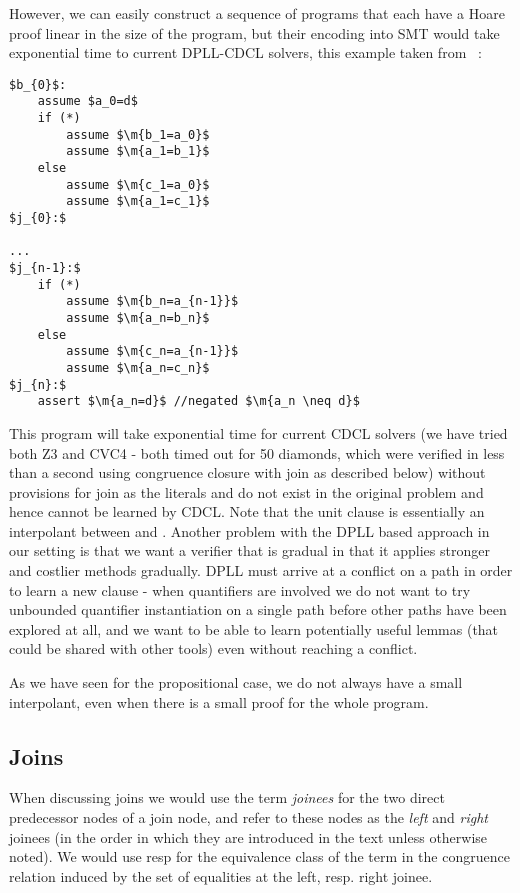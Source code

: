 However, we can easily construct a sequence of programs that each have a Hoare proof linear in the size of the program, but their encoding into SMT would take exponential time to current DPLL-CDCL solvers, this example taken from ~\cite{DPLLJoin}:
\begin{lstlisting}[caption={linear join proof},label=snippet3.4]
$b_{0}$:
	assume $a_0=d$
	if (*)
		assume $\m{b_1=a_0}$
		assume $\m{a_1=b_1}$
	else
		assume $\m{c_1=a_0}$
		assume $\m{a_1=c_1}$
$j_{0}:$

...
$j_{n-1}:$
	if (*)
		assume $\m{b_n=a_{n-1}}$
		assume $\m{a_n=b_n}$
	else
		assume $\m{c_n=a_{n-1}}$
		assume $\m{a_n=c_n}$
$j_{n}:$
	assert $\m{a_n=d}$ //negated $\m{a_n \neq d}$
\end{lstlisting}

This program will take exponential time for current CDCL solvers (we have tried both Z3 and CVC4 - both timed out for 50 diamonds, which were verified in less than a second using congruence closure with join as described below) without provisions for join as the literals  and  do not exist in the original problem and hence cannot be learned by CDCL. 
Note that the unit clause  is essentially an interpolant between  and . 
Another problem with the DPLL based approach in our setting is that we want a verifier that is gradual in that it applies stronger and costlier methods gradually. DPLL must arrive at a conflict on a path in order to learn a new clause - when quantifiers are involved we do not want to try unbounded quantifier instantiation on a single path before other paths have been explored at all, and we want to be able to learn potentially useful lemmas (that could be shared with other tools) even without reaching a conflict.

As we have seen for the propositional case, we do not always have a small interpolant, even when there is a small proof for the whole program. 

\subsection{Joins}
When discussing joins we would use the term \emph{joinees} for the two direct predecessor nodes of a join node, and refer to these nodes as the \emph{left} and \emph{right} joinees (in the order in which they are introduced in the text unless otherwise noted).
We would use  resp  for the equivalence class of the term  in the congruence relation induced by the set of equalities at the left, resp. right joinee.


